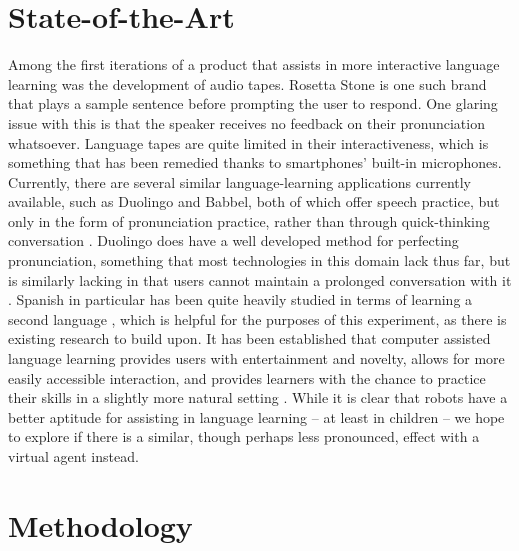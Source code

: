 \documentclass{vgtc}                          %
\begin{document}
\section{State-of-the-Art}
Among the first iterations of a product that assists in more interactive language learning was the development of audio tapes.
Rosetta Stone is one such brand that plays a sample sentence before prompting the user to respond. One glaring issue with this is that the speaker receives no feedback on their pronunciation whatsoever.
Language tapes are quite limited in their interactiveness, which is something that has been remedied thanks to smartphones’ built-in microphones.
Currently, there are several similar language-learning applications currently available, such as Duolingo and Babbel, both of which offer speech practice, but only in the form of pronunciation practice, rather than through quick-thinking conversation \cite{Bajorek:2017}.
Duolingo does have a well developed method for perfecting pronunciation, something that most technologies in this domain lack thus far, but is similarly lacking in that users cannot maintain a prolonged conversation with it \cite{Bajorek:2017}.
Spanish in particular has been quite heavily studied in terms of learning a second language \cite{Reyes:2020}, which is helpful for the purposes of this experiment, as there is existing research to build upon.
It has been established that computer assisted language learning provides users with entertainment and novelty, allows for more easily accessible interaction, and provides learners with the chance to practice their skills in a slightly more natural setting \cite{Ratnaningsih:2019}.
While it is clear that robots have a better aptitude for assisting in language learning \cite{Kennedy:2016}\cite{Berghe:2018} -- at least in children -- we hope to explore if there is a similar, though perhaps less pronounced, effect with a virtual agent instead.


\section{Methodology}
\end{document}
